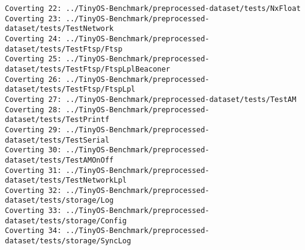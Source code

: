 \documentclass[11pt]{article}
\begin{document}
\begin{Verbatim}[commandchars=\\\{\}]
Coverting 22: ../TinyOS-Benchmark/preprocessed-dataset/tests/NxFloat
Coverting 23: ../TinyOS-Benchmark/preprocessed-dataset/tests/TestNetwork
Coverting 24: ../TinyOS-Benchmark/preprocessed-dataset/tests/TestFtsp/Ftsp
Coverting 25: ../TinyOS-Benchmark/preprocessed-dataset/tests/TestFtsp/FtspLplBeaconer
Coverting 26: ../TinyOS-Benchmark/preprocessed-dataset/tests/TestFtsp/FtspLpl
Coverting 27: ../TinyOS-Benchmark/preprocessed-dataset/tests/TestAM
Coverting 28: ../TinyOS-Benchmark/preprocessed-dataset/tests/TestPrintf
Coverting 29: ../TinyOS-Benchmark/preprocessed-dataset/tests/TestSerial
Coverting 30: ../TinyOS-Benchmark/preprocessed-dataset/tests/TestAMOnOff
Coverting 31: ../TinyOS-Benchmark/preprocessed-dataset/tests/TestNetworkLpl
Coverting 32: ../TinyOS-Benchmark/preprocessed-dataset/tests/storage/Log
Coverting 33: ../TinyOS-Benchmark/preprocessed-dataset/tests/storage/Config
Coverting 34: ../TinyOS-Benchmark/preprocessed-dataset/tests/storage/SyncLog

    \end{Verbatim}
\end{document}
